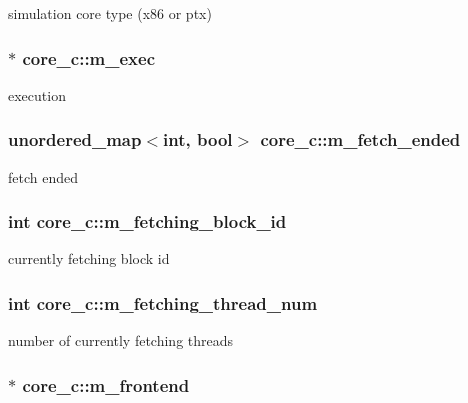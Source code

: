 \label{classcore__c_adf344458048cd602bb5ed05704db3891}
simulation core type (x86 or ptx) \hypertarget{classcore__c_ad39543515fdd2762eaa6cafb90691439}{
\subsubsection[{m\_\-exec}]{$\ast$ {\bf core\_\-c::m\_\-exec}}}
\label{classcore__c_ad39543515fdd2762eaa6cafb90691439}
execution \hypertarget{classcore__c_a51b424c11b010c0ade2f8da3ad5b041d}{
\subsubsection[{m\_\-fetch\_\-ended}]{\setlength{\rightskip}{0pt plus 5cm}unordered\_\-map$<$int, bool$>$ {\bf core\_\-c::m\_\-fetch\_\-ended}}}
\label{classcore__c_a51b424c11b010c0ade2f8da3ad5b041d}
fetch ended \hypertarget{classcore__c_a24aae8bf7cbba3721c5c94c0bbfa3a67}{
\subsubsection[{m\_\-fetching\_\-block\_\-id}]{\setlength{\rightskip}{0pt plus 5cm}int {\bf core\_\-c::m\_\-fetching\_\-block\_\-id}}}
\label{classcore__c_a24aae8bf7cbba3721c5c94c0bbfa3a67}
currently fetching block id \hypertarget{classcore__c_a7d7c4ac42b94e7bc0cbdc03f64b390e0}{
\subsubsection[{m\_\-fetching\_\-thread\_\-num}]{\setlength{\rightskip}{0pt plus 5cm}int {\bf core\_\-c::m\_\-fetching\_\-thread\_\-num}}}
\label{classcore__c_a7d7c4ac42b94e7bc0cbdc03f64b390e0}
number of currently fetching threads \hypertarget{classcore__c_aef4ae847c7137fb984b2e2fa2e2d8128}{
\subsubsection[{m\_\-frontend}]{$\ast$ {\bf core\_\-c::m\_\-frontend}}}
